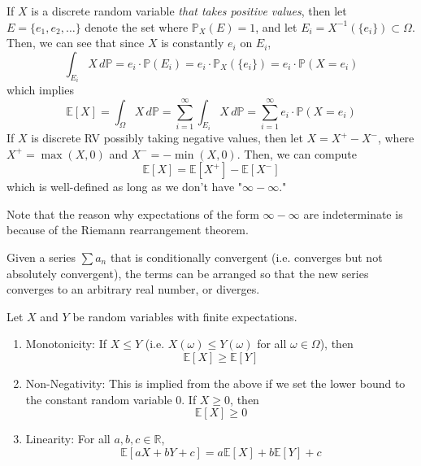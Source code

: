   \begin{definition}
    If $X$ is a discrete random variable \textit{that takes positive values}, then let $E = \{e_1, e_2, \ldots\}$ denote the set where $\mathbb{P}_X(E) = 1$, and let $E_i = X^{-1} (\{e_i\}) \subset \Omega$. Then, we can see that since $X$ is constantly $e_i$ on $E_i$, 
    \begin{equation}
      \int_{E_i} X \, d\mathbb{P} = e_i \cdot \mathbb{P}(E_i) = e_i \cdot \mathbb{P}_X (\{e_i\}) = e_i \cdot \mathbb{P}(X = e_i)
    \end{equation}
    which implies 
    \begin{equation}
      \mathbb{E}[X] = \int_\Omega X \, d\mathbb{P} = \sum_{i=1}^\infty \int_{E_i} X \, d\mathbb{P} = \sum_{i=1}^\infty e_i \cdot \mathbb{P}(X = e_i)
    \end{equation}
    If $X$ is discrete RV possibly taking negative values, then let $X = X^+ - X^-$, where $X^+ = \max(X, 0)$ and $X^- = - \min(X, 0)$. Then, we can compute 
    \begin{equation}
      \mathbb{E}[X] = \mathbb{E}[X^+] - \mathbb{E}[X^-]
    \end{equation}
    which is well-defined as long as we don't have "$\infty - \infty$."
  \end{definition}

  Note that the reason why expectations of the form $\infty - \infty$ are indeterminate is because of the Riemann rearrangement theorem. 

  \begin{theorem}
    Given a series $\sum a_n$ that is conditionally convergent (i.e. converges but not absolutely convergent), the terms can be arranged so that the new series converges to an arbitrary real number, or diverges. 
  \end{theorem}

  \begin{lemma}
    Let $X$ and $Y$ be random variables with finite expectations. 
    \begin{enumerate}
      \item Monotonicity: If $X \leq Y$ (i.e. $X(\omega) \leq Y(\omega)$ for all $\omega \in \Omega$), then 
      \begin{equation}
        \mathbb{E}[X] \geq \mathbb{E}[Y]
      \end{equation}
      
      \item Non-Negativity: This is implied from the above if we set the lower bound to the constant random variable $0$. If $X \geq 0$, then 
      \begin{equation}
        \mathbb{E}[X] \geq 0
      \end{equation}
      
      \item Linearity: For all $a, b, c \in \mathbb{R}$, 
      \begin{equation}
        \mathbb{E}[a X + b Y + c] = a \mathbb{E}[X] + b \mathbb{E}[Y] + c
      \end{equation}
    \end{enumerate}
  \end{lemma}

